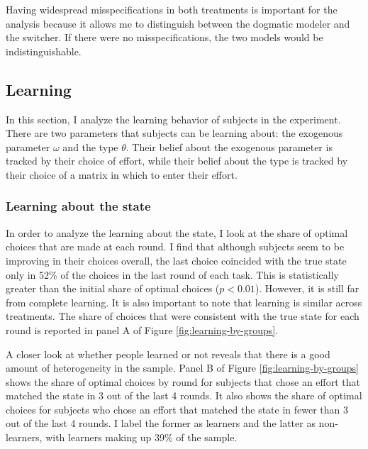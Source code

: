 \documentclass[
  12pt,
]{article}
\begin{document}
Having widespread misspecifications in both treatments is important for
the analysis because it allows me to distinguish between the dogmatic
modeler and the switcher. If there were no misspecifications, the two
models would be indistinguishable.

\hypertarget{learning}{%
\subsection{Learning}\label{learning}}

In this section, I analyze the learning behavior of subjects in the
experiment. There are two parameters that subjects can be learning
about: the exogenous parameter \(\omega\) and the type \(\theta\). Their
belief about the exogenous parameter is tracked by their choice of
effort, while their belief about the type is tracked by their choice of
a matrix in which to enter their effort.

\hypertarget{learning-about-the-state}{%
\subsubsection{Learning about the
state}\label{learning-about-the-state}}

In order to analyze the learning about the state, I look at the share of
optimal choices that are made at each round. I find that although
subjects seem to be improving in their choices overall, the last choice
coincided with the true state only in 52\% of the choices in the last
round of each task. This is statistically greater than the initial share
of optimal choices (\(p<0.01\)). However, it is still far from complete
learning. It is also important to note that learning is similar across
treatments. The share of choices that were consistent with the true
state for each round is reported in panel A of Figure
\ref{fig:learning-by-groups}.

A closer look at whether people learned or not reveals that there is a
good amount of heterogeneity in the sample. Panel B of Figure
\ref{fig:learning-by-groups} shows the share of optimal choices by round
for subjects that chose an effort that matched the state in 3 out of the
last 4 rounds. It also shows the share of optimal choices for subjects
who chose an effort that matched the state in fewer than 3 out of the
last 4 rounds. I label the former as learners and the latter as
non-learners, with learners making up 39\% of the sample.
\end{document}
